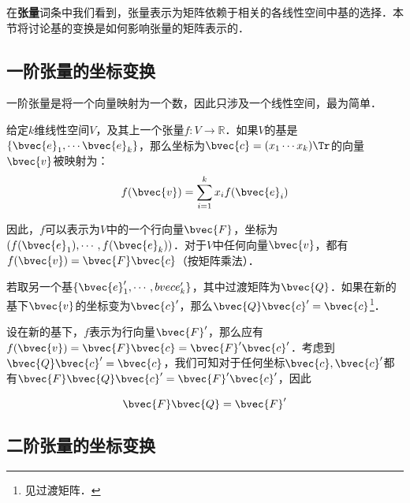 

在\textbf{张量}词条中我们看到，张量表示为矩阵依赖于相关的各线性空间中基的选择．本节将讨论基的变换是如何影响张量的矩阵表示的．

\subsection{一阶张量的坐标变换}
一阶张量是将一个向量映射为一个数，因此只涉及一个线性空间，最为简单．

给定$k$维线性空间$V$，及其上一个张量$f:V\rightarrow\mathbb{R}$．如果$V$的基是$\{\bvec{e}_1, \cdots\bvec{e}_k\}$，那么坐标为$\bvec{c}=(x_1\cdots x_k)\Tr$的向量$\bvec{v}$被映射为：
\begin{equation}
f(\bvec{v})=\sum\limits_{i=1}^k x_if(\bvec{e}_i)
\end{equation}

因此，$f$可以表示为$V$中的一个行向量$\bvec{F}$，坐标为$(f(\bvec{e}_1), \cdots, f(\bvec{e}_k))$．对于$V$中任何向量$\bvec{v}$，都有$f(\bvec{v})=\bvec{F}\bvec{c}$（按矩阵乘法）．

若取另一个基$\{\bvec{e}_1', \cdots, \\bvec{e}_k'\}$，其中过渡矩阵为$\bvec{Q}$．如果在新的基下$\bvec{v}$的坐标变为$\bvec{c}'$，那么$\bvec{Q}\bvec{c}'=\bvec{c}$\footnote{见过渡矩阵．}．

设在新的基下，$f$表示为行向量$\bvec{F}'$，那么应有$f(\bvec{v})=\bvec{F}\bvec{c}=\bvec{F}'\bvec{c}'$．考虑到$\bvec{Q}\bvec{c}'=\bvec{c}$，我们可知对于任何坐标$\bvec{c}, \bvec{c}'$都有$\bvec{F}\bvec{Q}\bvec{c}'=\bvec{F}'\bvec{c}'$，因此

\begin{equation}
\bvec{F}\bvec{Q}=\bvec{F}'
\end{equation}


\subsection{二阶张量的坐标变换}









